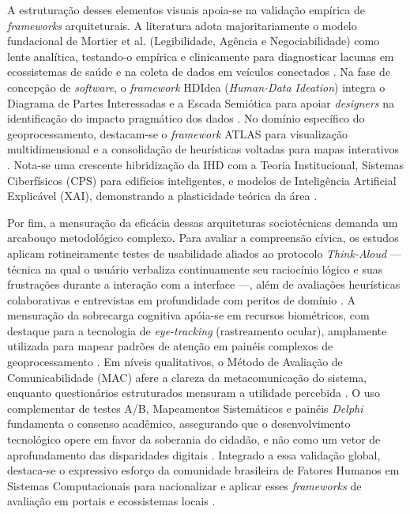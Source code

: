 \documentclass[12pt]{article}
\begin{document}
    A estruturação desses elementos visuais apoia-se na validação empírica de \textit{frameworks} arquiteturais. A literatura adota majoritariamente o modelo fundacional de Mortier et al. (Legibilidade, Agência e Negociabilidade) como lente analítica, testando-o empírica e clinicamente para diagnosticar lacunas em ecossistemas de saúde e na coleta de dados em veículos conectados \cite{mortier2015humandatainteractionhumanface, DOWTHWAITE2024, Lenzi2024, Burzio2024, Meechan2023, Victorelli2023Evaluating, Stead2022, Sailaja2021, Lockwood2021, Crabtree2021, Zou2020769, Victorelli2020Human, Locoro2020, Lockwood2020AnAccessible, cezar2023cognitive, sailaja2021exploring}. Na fase de concepção de \textit{software}, o \textit{framework} HDIdea (\textit{Human-Data Ideation}) integra o Diagrama de Partes Interessadas e a Escada Semiótica para apoiar \textit{designers} na identificação do impacto pragmático dos dados \cite{Strey2019Human}. No domínio específico do geoprocessamento, destacam-se o \textit{framework} ATLAS para visualização multidimensional e a consolidação de heurísticas voltadas para mapas interativos \cite{Capeleti2024Human}. Nota-se uma crescente hibridização da IHD com a Teoria Institucional, Sistemas Ciberfísicos (CPS) para edifícios inteligentes, e modelos de Inteligência Artificial Explicável (XAI), demonstrando a plasticidade teórica da área \cite{hayes2024making, Jandric2023, Zou2020769, mu2024institutional, bavaresco2019technological, durango2024data, Yuan20243615, Turkay2021}.

    Por fim, a mensuração da eficácia dessas arquiteturas sociotécnicas demanda um arcabouço metodológico complexo. Para avaliar a compreensão cívica, os estudos aplicam rotineiramente testes de usabilidade aliados ao protocolo \textit{Think-Aloud} — técnica na qual o usuário verbaliza continuamente seu raciocínio lógico e suas frustrações durante a interação com a interface —, além de avaliações heurísticas colaborativas e entrevistas em profundidade com peritos de domínio \cite{Strey2019Human}. A mensuração da sobrecarga cognitiva apóia-se em recursos biométricos, com destaque para a tecnologia de \textit{eye-tracking} (rastreamento ocular), amplamente utilizada para mapear padrões de atenção em painéis complexos de geoprocessamento \cite{Capeleti2024Human, kaufmann2021ethical}. Em níveis qualitativos, o Método de Avaliação de Comunicabilidade (MAC) afere a clareza da metacomunicação do sistema, enquanto questionários estruturados mensuram a utilidade percebida \cite{Belizario2023Interacao, Capeleti2024Human}. O uso complementar de testes A/B, Mapeamentos Sistemáticos e painéis \textit{Delphi} fundamenta o consenso acadêmico, assegurando que o desenvolvimento tecnológico opere em favor da soberania do cidadão, e não como um vetor de aprofundamento das disparidades digitais \cite{calvetti2024human, hayes2024making, Refat2023}. Integrado a essa validação global, destaca-se o expressivo esforço da comunidade brasileira de Fatores Humanos em Sistemas Computacionais para nacionalizar e aplicar esses \textit{frameworks} de avaliação em portais e ecossistemas locais \cite{Capeleti2024Human, Strey2019Human, Belizario2023Interacao}.
\end{document}
